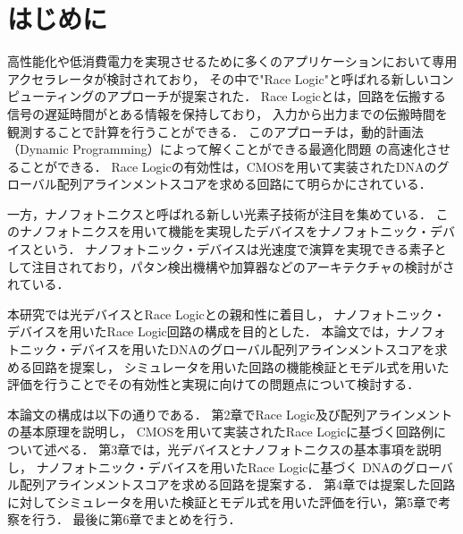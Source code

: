 \chapter{はじめに}
高性能化や低消費電力を実現させるために多くのアプリケーションにおいて専用アクセラレータが検討されており，
その中で"Race Logic"と呼ばれる新しいコンピューティングのアプローチが提案された\cite{madhavan2014race}．
Race Logicとは，回路を伝搬する信号の遅延時間がとある情報を保持しており，
入力から出力までの伝搬時間を観測することで計算を行うことができる．
このアプローチは，動的計画法（Dynamic Programming）によって解くことができる最適化問題
の高速化させることができる．
Race Logicの有効性は，CMOSを用いて実装されたDNAのグローバル配列アラインメントスコアを求める回路にて明らかにされている．

一方，ナノフォトニクスと呼ばれる新しい光素子技術が注目を集めている．
このナノフォトニクスを用いて機能を実現したデバイスをナノフォトニック・デバイスという．
ナノフォトニック・デバイスは光速度で演算を実現できる素子として注目されており，パタン検出機構や加算器などのアーキテクチャの検討がされている．

本研究では光デバイスとRace Logicとの親和性に着目し，
ナノフォトニック・デバイスを用いたRace Logic回路の構成を目的とした．
本論文では，ナノフォトニック・デバイスを用いたDNAのグローバル配列アラインメントスコアを求める回路を提案し，
シミュレータを用いた回路の機能検証とモデル式を用いた評価を行うことでその有効性と実現に向けての問題点について検討する．

本論文の構成は以下の通りである．
第2章でRace Logic及び配列アラインメントの基本原理を説明し，
CMOSを用いて実装されたRace Logicに基づく回路例について述べる．
第3章では，光デバイスとナノフォトニクスの基本事項を説明し，
ナノフォトニック・デバイスを用いたRace Logicに基づく
DNAのグローバル配列アラインメントスコアを求める回路を提案する．
第4章では提案した回路に対してシミュレータを用いた検証とモデル式を用いた評価を行い，第5章で考察を行う．
最後に第6章でまとめを行う．

